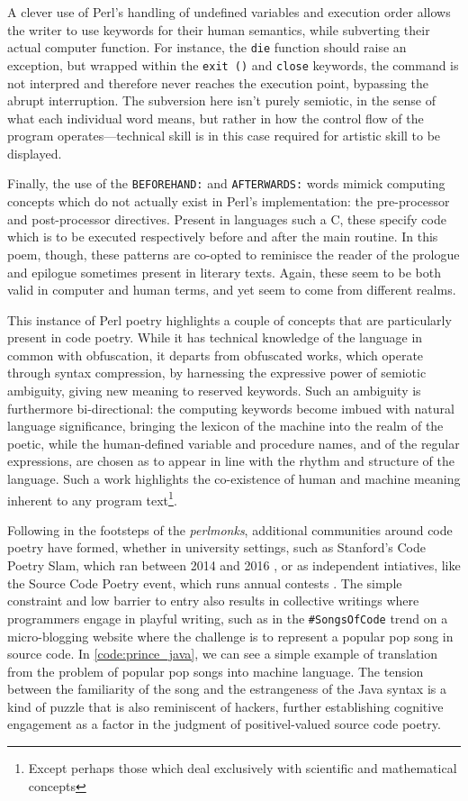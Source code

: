 A clever use of Perl's handling of undefined variables and execution order allows the writer to use keywords for their human semantics, while subverting their actual computer function. For instance, the \lstinline{die} function should raise an exception, but wrapped within the \lstinline{exit ()} and \lstinline{close} keywords, the command is not interpred and therefore never reaches the execution point, bypassing the abrupt interruption. The subversion here isn't purely semiotic, in the sense of what each individual word means, but rather in how the control flow of the program operates—technical skill is in this case required for artistic skill to be displayed.

Finally, the use of the \lstinline{BEFOREHAND:} and \lstinline{AFTERWARDS:} words mimick computing concepts which do not actually exist in Perl's implementation: the pre-processor and post-processor directives. Present in languages such a C, these specify code which is to be executed respectively before and after the main routine. In this poem, though, these patterns are co-opted to reminisce the reader of the prologue and epilogue sometimes present in literary texts. Again, these seem to be both valid in computer and human terms, and yet seem to come from different realms.

This instance of Perl poetry highlights a couple of concepts that are particularly present in code poetry. While it has technical knowledge of the language in common with obfuscation, it departs from obfuscated works, which operate through syntax compression, by harnessing the expressive power of semiotic ambiguity, giving new meaning to reserved keywords. Such an ambiguity is furthermore bi-directional: the computing keywords become imbued with natural language significance, bringing the lexicon of the machine into the realm of the poetic, while the human-defined variable and procedure names, and of the regular expressions, are chosen as to appear in line with the rhythm and structure of the language. Such a work highlights the co-existence of human and machine meaning inherent to any program text\footnote{Except perhaps those which deal exclusively with scientific and mathematical concepts}.

Following in the footsteps of the \emph{perlmonks}, additional communities around code poetry have formed, whether in university settings, such as Stanford's Code Poetry Slam, which ran between 2014 and 2016 \citep{kagen_code_2016}, or as independent intiatives, like the Source Code Poetry event, which runs annual contests \citep{unknown_source_2017}. The simple constraint and low barrier to entry also results in collective writings where programmers engage in playful writing, such as in the \lstinline{#SongsOfCode} trend on a micro-blogging website where the challenge is to represent a popular pop song in source code. In \autoref{code:prince_java}, we can see a simple example of translation from the problem of popular pop songs into machine language. The tension between the familiarity of the song and the estrangeness of the Java syntax is a kind of puzzle that is also reminiscent of hackers, further establishing cognitive engagement as a factor in the judgment of  positivel-valued source code poetry.

